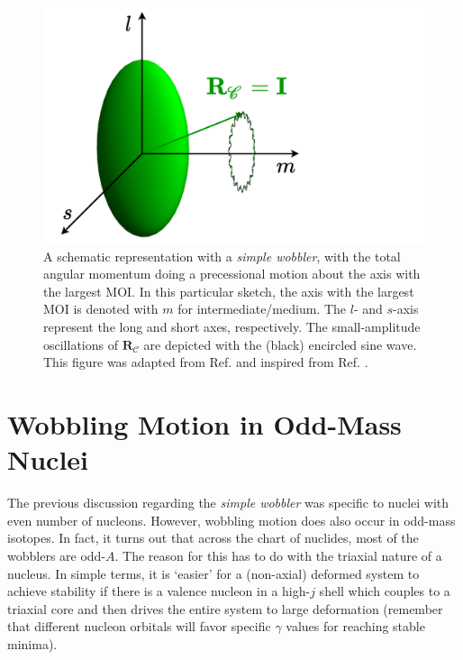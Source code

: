 \begin{figure}
    \centering
    \includegraphics[scale=0.6]{Chapters/Figures/simple_wobbler-schematic.pdf}
    \caption{A schematic representation with a \emph{simple wobbler}, with the total angular momentum doing a precessional motion about the axis with the largest MOI. In this particular sketch, the axis with the largest MOI is denoted with $m$ for intermediate/medium. The $l$- and $s$-axis represent the long and short axes, respectively. The small-amplitude oscillations of $\mathbf{R}_\mathscr{C}$ are depicted with the (black) encircled sine wave. This figure was adapted from Ref. \cite{poenaru2021extensive1} and inspired from Ref. \cite{sensharma2020longitudinal}.}
    \label{simple-wobbler-geometrical-schematic}
\end{figure}

\section{Wobbling Motion in Odd-Mass Nuclei}

The previous discussion regarding the \emph{simple wobbler} was specific to nuclei with even number of nucleons. However, wobbling motion does also occur in odd-mass isotopes. In fact, it turns out that across the chart of nuclides, most of the wobblers are odd-$A$. The reason for this has to do with the triaxial nature of a nucleus. In simple terms, it is `easier' for a (non-axial) deformed system to achieve stability if there is a valence nucleon in a high-$j$ shell which couples to a triaxial core and then drives the entire system to large deformation (remember that different nucleon orbitals will favor specific $\gamma$ values for reaching stable minima).


